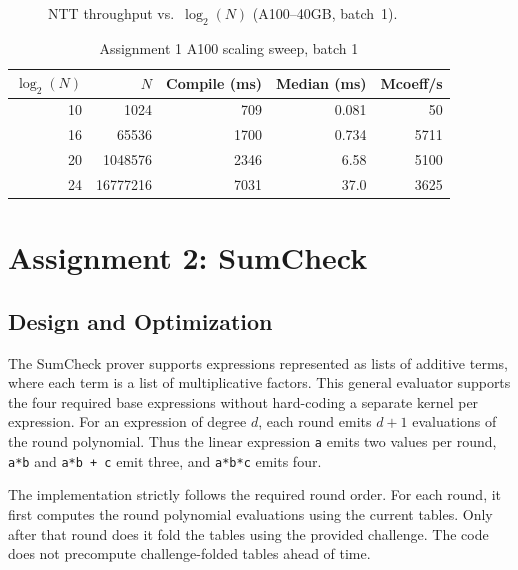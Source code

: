 \documentclass[conference]{IEEEtran}
\begin{document}
\begin{figure}[htbp]
\centering
{}
\caption{NTT throughput vs.\ $\log_2(N)$ (A100--40GB, batch~1).}
\label{fig:ntt-throughput}
\end{figure}

\begin{table}[htbp]
\caption{Assignment 1 A100 scaling sweep, batch 1}
\label{tab:a1-perf}
\centering
\footnotesize
\setlength{\tabcolsep}{4pt}
\begin{tabular}{@{}rrrrr@{}}
\toprule
$\log_2(N)$ & $N$ & Compile (ms) & Median (ms) & Mcoeff/s \\
\midrule
10 & 1024     & 709  & 0.081 & 50 \\
16 & 65536    & 1700 & 0.734 & 5711 \\
20 & 1048576  & 2346 & 6.58  & 5100 \\
24 & 16777216 & 7031 & 37.0  & 3625 \\
\bottomrule
\end{tabular}
\end{table}

\section{Assignment 2: SumCheck}
\subsection{Design and Optimization}
The SumCheck prover supports expressions represented as lists of additive
terms, where each term is a list of multiplicative factors. This general
evaluator supports the four required base expressions without hard-coding a
separate kernel per expression. For an expression of degree $d$, each round
emits $d+1$ evaluations of the round polynomial. Thus the linear expression
\texttt{a} emits two values per round, \texttt{a*b} and \texttt{a*b + c} emit
three, and \texttt{a*b*c} emits four.

The implementation strictly follows the required round order. For each round,
it first computes the round polynomial evaluations using the current tables.
Only after that round does it fold the tables using the provided challenge.
The code does not precompute challenge-folded tables ahead of time.
\end{document}
